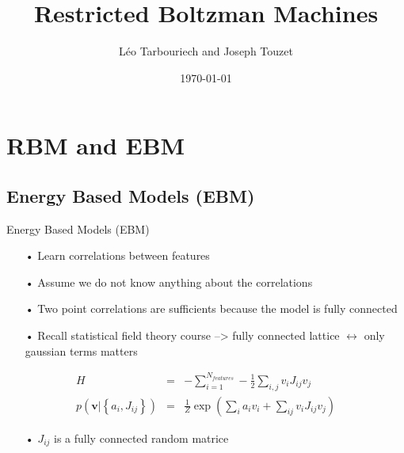 \documentclass{beamer}
\author{Léo Tarbouriech and Joseph Touzet}
\title{Restricted Boltzman Machines}
\institute{Machnie Learning \\ M2 PCS}
\date{\today}
\begin{document}
\begin{frame}
    \titlepage
\end{frame}





\begin{frame}
    \tableofcontents[sectionstyle=show,subsectionstyle=show,subsubsectionstyle=show/shaded/hide]
\end{frame}

\section{RBM and EBM}
\subsection{Energy Based Models (EBM)}
\begin{frame}{Energy Based Models (EBM)}
\begin{itemize}
\item[•] Learn correlations between features
\item[•] Assume we do not know anything about the correlations
\item[•] Two point correlations are sufficients because the model is fully connected
\item[•] Recall statistical field theory course --> fully connected lattice $\leftrightarrow$ only gaussian terms matters
\end{itemize}
\begin{eqnarray*}
	H & = & - \sum_{i = 1}^{N_{features}} - \frac{1}{2} \sum_{i,j} v_i J_{ij} v_j \\
	p(\mathbf{v} \vert \left\{a_i, J_{ij}\right\}) & = & \frac{1}{Z} \exp\left( \sum_{i} a_i v_i + \sum_{ij} v_i J_{ij} v_j \right)
\end{eqnarray*}


\begin{itemize}
\item[•] $J_{ij}$ is a fully connected random matrice
\end{itemize}
\end{frame}
\end{document}
